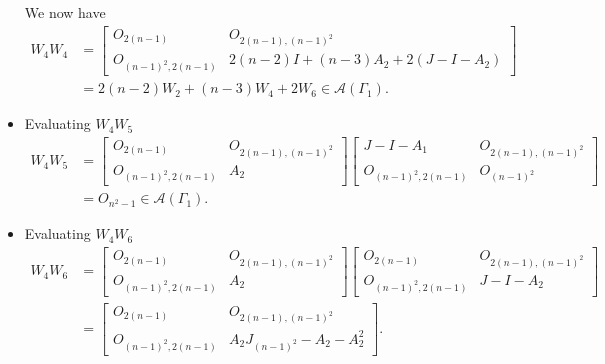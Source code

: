 \begin{itemize}
    We now have
    \begin{align*}
        W_4W_4
        &= \begin{bmatrix}
            O_{2(n-1)} & O_{2(n-1), (n-1)^2} \\
            O_{(n-1)^2, 2(n-1)} & 2(n-2)I + (n-3)A_2 + 2(J-I-A_2)
        \end{bmatrix} \\
        &= 2(n-2)W_2 + (n-3)W_4 + 2W_6\in\mathcal{A}(\Gamma_1).
    \end{align*}
    
    \item Evaluating $W_4W_5$
    \begin{align*}
        W_4W_5
        &= \begin{bmatrix}
            O_{2(n-1)} & O_{2(n-1), (n-1)^2} \\
            O_{(n-1)^2, 2(n-1)} & A_2
        \end{bmatrix}\begin{bmatrix}
            J-I-A_1 & O_{2(n-1), (n-1)^2} \\
            O_{(n-1)^2, 2(n-1)} & O_{(n-1)^2}
        \end{bmatrix}\\
        &= O_{n^2-1}\in\mathcal{A}(\Gamma_1).
    \end{align*}
    
    \item Evaluating $W_4W_6$
    \begin{align*}
        W_4W_6
        &= \begin{bmatrix}
            O_{2(n-1)} & O_{2(n-1), (n-1)^2} \\
            O_{(n-1)^2, 2(n-1)} & A_2
        \end{bmatrix}\begin{bmatrix}
            O_{2(n-1)} & O_{2(n-1), (n-1)^2} \\
            O_{(n-1)^2, 2(n-1)} & J-I-A_2
        \end{bmatrix}\\
        &= \begin{bmatrix}
            O_{2(n-1)} & O_{2(n-1), (n-1)^2} \\
            O_{(n-1)^2, 2(n-1)} & A_2J_{(n-1)^2} - A_2 - A_2^2
        \end{bmatrix}.
    \end{align*}


\end{itemize}
